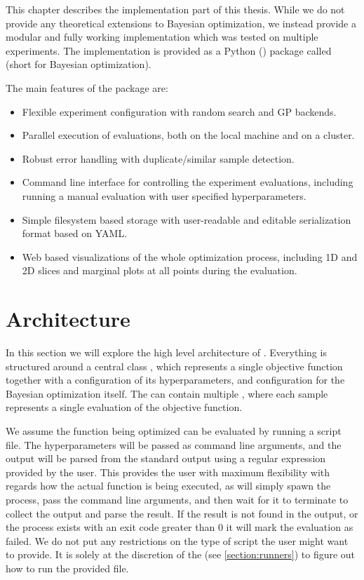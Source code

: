 This chapter describes the implementation part of this thesis. While we do not provide any theoretical extensions to Bayesian optimization, we instead provide a modular and fully working implementation which was tested on multiple experiments. The implementation is provided as a Python (\cite{python}) package called \bopt (short for Bayesian optimization).

The main features of the package are:

\begin{itemize}
    \item Flexible experiment configuration with random search and GP backends.
    \item Parallel execution of evaluations, both on the local machine and on a cluster.
    \item Robust error handling with duplicate/similar sample detection.
    \item Command line interface for controlling the experiment evaluations, including running a manual evaluation with user specified hyperparameters.
    \item Simple filesystem based storage with user-readable and editable serialization format based on YAML.
    \item Web based visualizations of the whole optimization process, including
    1D and 2D slices and marginal plots at all points during the evaluation.
\end{itemize}



\section{Architecture}

In this section we will explore the high level architecture of \bopt. Everything is structured around a central class , which represents a single objective function together with a configuration of its hyperparameters, and configuration for the Bayesian optimization itself. The  can contain multiple , where each sample represents a single evaluation of the objective function.

We assume the function being optimized can be evaluated by running a script file. The hyperparameters will be passed as command line arguments, and the output will be parsed from the standard output using a regular expression provided by the user. This provides the user with maximum flexibility with regards how the actual function is being executed, as \bopt will simply spawn the process, pass the command line arguments, and then wait for it to terminate to collect the output and parse the result. If the result is not found in the output, or the process exists with an exit code greater than $0$ it will mark the evaluation as failed. We do not put any restrictions on the type of script the user might want to provide. It is solely at the discretion of the  (see \autoref{section:runners}) to figure out how to run the provided file.

